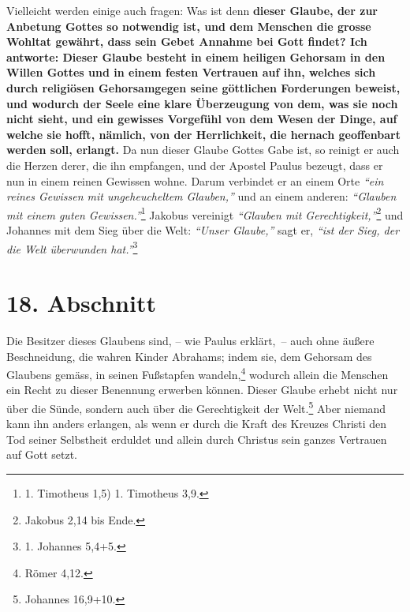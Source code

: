 Vielleicht werden einige auch fragen: Was ist denn \textbf{dieser Glaube, der
zur
Anbetung Gottes so notwendig ist, und dem Menschen die grosse Wohltat gewährt,
dass sein Gebet Annahme bei Gott findet? Ich antworte: Dieser Glaube besteht in
einem heiligen Gehorsam in den Willen Gottes und in einem festen Vertrauen auf
ihn, welches sich durch religiösen Gehorsamgegen
seine göttlichen Forderungen
beweist, und wodurch der Seele eine klare Überzeugung von dem, was sie noch
nicht sieht, und ein gewisses Vorgefühl von dem Wesen der Dinge, auf welche sie
hofft, nämlich, von der Herrlichkeit, die hernach geoffenbart werden soll,
erlangt.} Da nun dieser Glaube Gottes Gabe ist, so reinigt er auch die Herzen
derer, die ihn empfangen, und der Apostel Paulus bezeugt, dass er nun in einem
reinen Gewissen wohne. Darum verbindet er an einem Orte
\textit{"`ein reines Gewissen mit ungeheucheltem Glauben,"'} und an einem
anderen: \textit{"`Glauben mit einem guten
Gewissen."'}\footnote{1. Timotheus 1,5) 1. Timotheus 3,9.}
Jakobus vereinigt
\textit{"`Glauben mit Gerechtigkeit,"'}\footnote{Jakobus 2,14 bis Ende.}
und Johannes mit dem Sieg über
die Welt:\textit{ "`Unser Glaube,"'} sagt er, \textit{"`ist der Sieg, der die
Welt überwunden hat."'}\footnote{1. Johannes
5,4+5.}

\section{18. Abschnitt} \label{kap6_ab18}

Die Besitzer dieses Glaubens sind, -- wie Paulus erklärt,~-- auch ohne äußere
Beschneidung, die wahren Kinder
Abrahams; indem sie, dem Gehorsam des Glaubens
gemäss, in seinen Fußstapfen wandeln,\footnote{Römer 4,12.}
wodurch allein die
Menschen ein Recht zu dieser Benennung erwerben können. Dieser Glaube erhebt
nicht nur über die Sünde, sondern auch über die
Gerechtigkeit der Welt.\footnote{Johannes 16,9+10.}
Aber niemand kann ihn anders erlangen, als wenn
er durch die Kraft des Kreuzes Christi den Tod seiner
Selbstheit
erduldet und allein durch Christus sein ganzes Vertrauen auf Gott setzt.


